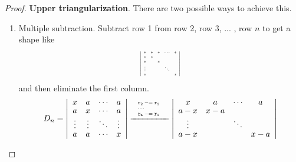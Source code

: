 \documentclass{report}
\theoremstyle{nonumberplain}
\newtheorem{proof}{Proof.}
\newcommand{\minuseq}{\mathrel{{-}{=}}}
\newcommand\scalemath[2]{\scalebox{#1}{\mbox{\ensuremath{\displaystyle #2}}}}
\begin{document}
\begin{proof}
	\textbf{Upper triangularization}. There are two possible ways to achieve this.
	\begin{enumerate}
		\item Multiple subtraction. Subtract row 1 from row 2, row 3, ... , row $n$ to get a shape like
		      \begin{equation*}
			      \scalemath{0.55}{
				      \left|\begin{array}{ccccc}
					      *      & * & * & \cdots & * \\
					      *      & * &   &        &   \\
					      *      &   & * &        &   \\
					      \vdots &   &   & \ddots &   \\
					      *      &   &   &        & *
				      \end{array}\right|}
		      \end{equation*}
		      and then eliminate the first column.
		      \begin{equation*}
			      \begin{aligned}
				      D_{n}=\left|\begin{array}{cccc}
					      x      & a      & \cdots & a      \\
					      a      & x      & \cdots & a      \\
					      \vdots & \vdots & \ddots & \vdots \\
					      a      & a      & \cdots & x
				      \end{array}\right| & \xlongequal{\scalemath{0.65}{\arraycolsep=10pt\def\arraystretch{0.85}
						      \begin{array}{l}
							      \mathtt{r_2\minuseq r_1} \\
							      \cdots                   \\
							      \mathtt{r_n\minuseq r_1}
						      \end{array}}}
				      \left|\begin{array}{cccc}
					      x      & a   & \cdots & a   \\
					      a-x    & x-a &        &     \\
					      \vdots &     & \ddots &     \\
					      a-x    &     &        & x-a
				      \end{array}\right|                                                                                                \\

\end{aligned}
\end{equation*}
\end{enumerate}
\end{proof}
\end{document}
